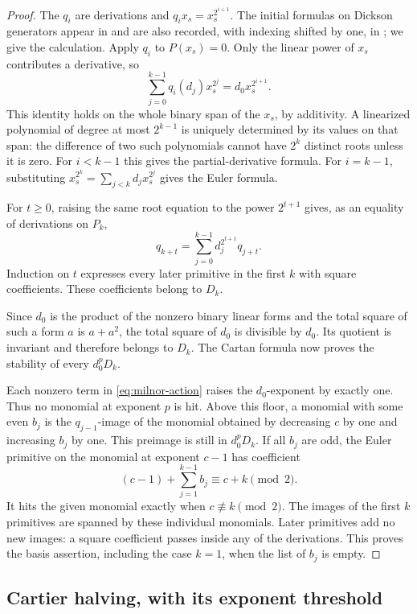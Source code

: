 \begin{proof}
The $q_i$ are derivations and $q_i x_s=x_s^{2^{i+1}}$.
The initial formulas on Dickson generators appear in
\cite[Corollary~2.3(b)]{Wilkerson1983} and are also recorded, with
indexing shifted by one, in \cite[Proposition~2.3]{Sum2020}; we give the
calculation.  Apply $q_i$ to $P(x_s)=0$.  Only the linear power of $x_s$
contributes a derivative, so
\[
 \sum_{j=0}^{k-1}q_i(d_j)x_s^{2^j}=d_0x_s^{2^{i+1}}.
\]
This identity holds on the whole binary span of the $x_s$, by additivity.
A linearized polynomial of degree at most $2^{k-1}$ is uniquely
determined by its values on that span: the difference of two such
polynomials cannot have $2^k$ distinct roots unless it is zero.
For $i<k-1$ this gives the partial-derivative formula.  For $i=k-1$,
substituting $x_s^{2^k}=\sum_{j<k}d_jx_s^{2^j}$ gives the Euler formula.

For $t\geq0$, raising the same root equation to the power $2^{t+1}$
gives, as an equality of derivations on $P_k$,
\[
 q_{k+t}=\sum_{j=0}^{k-1}d_j^{2^{t+1}}q_{j+t}.
\]
Induction on $t$ expresses every later primitive in the first $k$ with
square coefficients.  These coefficients belong to $D_k$.

Since $d_0$ is the product of the nonzero binary linear forms and the
total square of such a form $a$ is $a+a^2$, the total square of $d_0$
is divisible by $d_0$.  Its quotient is invariant and therefore belongs
to $D_k$.  The Cartan formula now proves the stability of every
$d_0^pD_k$.

Each nonzero term in \eqref{eq:milnor-action} raises the $d_0$-exponent
by exactly one.  Thus no monomial at exponent $p$ is hit.  Above this
floor, a monomial with some even $b_j$ is the $q_{j-1}$-image of the
monomial obtained by decreasing $c$ by one and increasing $b_j$ by one.
This preimage is still in $d_0^pD_k$.  If all $b_j$ are odd, the Euler
primitive on the monomial at exponent $c-1$ has coefficient
\[
 (c-1)+\sum_{j=1}^{k-1}b_j\equiv c+k\pmod2.
\]
It hits the given monomial exactly when $c\not\equiv k\pmod2$.
The images of the first $k$ primitives are spanned by these individual
monomials.  Later primitives add no new images: a square coefficient
passes inside any of the derivations.  This proves the basis assertion,
including the case $k=1$, when the list of $b_j$ is empty.
\end{proof}

\subsection{Cartier halving, with its exponent threshold}

